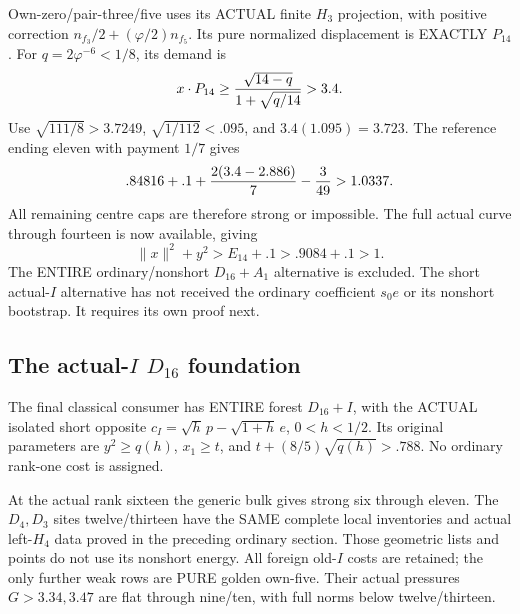 Own-zero/pair-three/five uses its ACTUAL
finite \(H_3\) projection, with positive
correction \(n_{f_3}/2+(\varphi/2)n_{f_5}\).
Its pure normalized displacement is
EXACTLY \(P_{14}\).
For \(q=2\varphi^{-6}<1/8\), its demand is
\[
                  x\cdot P_{14}\ge
                  {\sqrt{14-q}\over1+\sqrt{q/14}}>3.4 .
\]
Use \(\sqrt{111/8}>3.7249\),
\(\sqrt{1/112}<.095\), and
\(3.4(1.095)=3.723\).
The reference ending eleven with
payment \(1/7\) gives
\[
                    .84816+.1+{2(3.4-2.886)\over7}-{3\over49}>1.0337 .
\]
All remaining centre caps are therefore
strong or impossible.
The full actual curve through fourteen
is now available, giving
\[
                        \|x\|^2+y^2>E_{14}+.1>.9084+.1>1 .
\]
The ENTIRE ordinary/nonshort \(D_{16}+A_1\)
alternative is excluded.
The short actual-\(I\) alternative has
not received the ordinary coefficient
\(s_0e\) or its nonshort bootstrap.
It requires its own proof next.

\subsection{The actual-\(I\) \(D_{16}\) foundation}
\label{app:arithD16Ifoundation}

The final classical consumer has ENTIRE
forest \(D_{16}+I\), with the ACTUAL
isolated short opposite
\(c_I=\sqrt h\,p-\sqrt{1+h}\,e\),
\(0<h<1/2\).
Its original parameters are
\(y^2\ge q(h)\), \(x_1\ge t\), and
\(t+(8/5)\sqrt{q(h)}>.788\).
No ordinary rank-one cost is assigned.

At the actual rank sixteen the generic
bulk gives strong six through eleven.
The \(D_4,D_3\) sites twelve/thirteen
have the SAME complete local inventories
and actual left-\(H_4\) data proved in
the preceding ordinary section.
Those geometric lists and points do
not use its nonshort energy.
All foreign old-\(I\) costs are retained;
the only further weak rows are PURE
golden own-five.
Their actual pressures \(G>3.34,3.47\)
are flat through nine/ten, with full
norms below twelve/thirteen.

